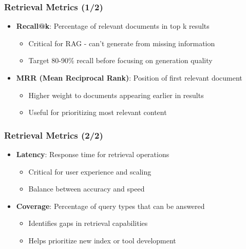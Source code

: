 \begin{frame}
    \frametitle{Retrieval Metrics (1/2)}
    \begin{itemize}
        \item \textbf{Recall@k}: Percentage of relevant documents in top k results
        \begin{itemize}
            \item Critical for RAG - can't generate from missing information
            \item Target 80-90\% recall before focusing on generation quality
        \end{itemize}
        \item \textbf{MRR (Mean Reciprocal Rank)}: Position of first relevant document
        \begin{itemize}
            \item Higher weight to documents appearing earlier in results
            \item Useful for prioritizing most relevant content
        \end{itemize}
    \end{itemize}
\end{frame}

\begin{frame}
    \frametitle{Retrieval Metrics (2/2)}
    \begin{itemize}
        \item \textbf{Latency}: Response time for retrieval operations
        \begin{itemize}
            \item Critical for user experience and scaling
            \item Balance between accuracy and speed
        \end{itemize}
        \item \textbf{Coverage}: Percentage of query types that can be answered
        \begin{itemize}
            \item Identifies gaps in retrieval capabilities
            \item Helps prioritize new index or tool development
        \end{itemize}
    \end{itemize}
    
    \vspace{0.3cm}
    \begin{center}
    \end{center}
\end{frame}

